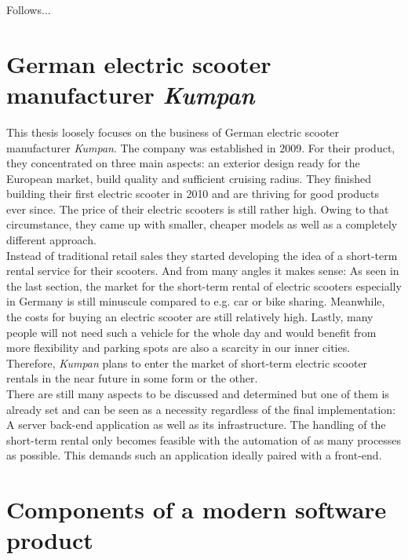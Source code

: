 \documentclass[12pt,a4paper]{report}
\begin{document}
Follows...


\section{German electric scooter manufacturer \emph{Kumpan}}

This thesis loosely focuses on the business of German electric scooter manufacturer \emph{Kumpan}.
The company was established in 2009. For their product, they concentrated on three main aspects:
an exterior design ready for the European market, build quality and sufficient cruising radius.
They finished building their first electric scooter in 2010 and are thriving for good products ever since.
The price of their electric scooters is still rather high. Owing to that circumstance,
they came up with smaller, cheaper models as well as a completely different approach.\\
Instead of traditional retail sales they started developing the idea of a
short-term rental service for their scooters. And from many angles it makes sense:
As seen in the last section, the market for the short-term rental of electric scooters
especially in Germany is still minuscule compared to e.g. car or bike sharing.
Meanwhile, the costs for buying an electric scooter are still relatively high.
Lastly, many people will not need such a vehicle for the whole day and would benefit
from more flexibility and parking spots are also a scarcity in our inner cities.
Therefore, \emph{Kumpan} plans to enter the market of short-term electric scooter rentals
in the near future in some form or the other.\\
There are still many aspects to be discussed and determined but one of them
is already set and can be seen as a necessity regardless of the final implementation:
A server back-end application as well as its infrastructure.
The handling of the short-term rental only becomes feasible with the automation
of as many processes as possible. This demands such an application ideally paired
with a front-end.


\section{Components of a modern software product}
\end{document}
